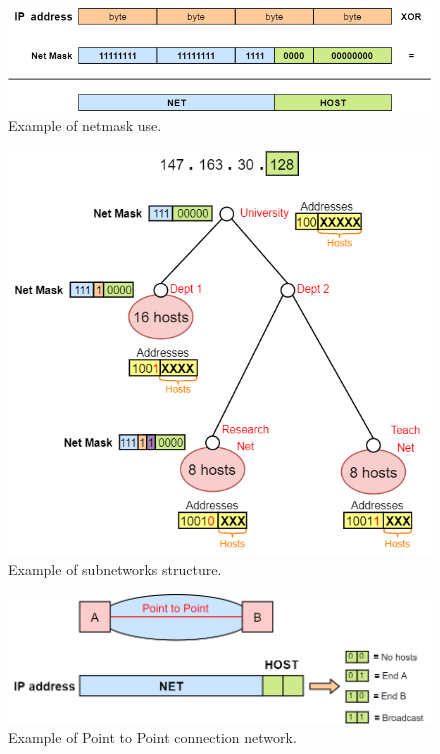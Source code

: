 \begin{figure}[h]
\centering
\includegraphics[scale=0.5]{Images/IP/netmask}
\caption{\footnotesize{Example of netmask use.}}\label{netmask}
\end{figure}
\begin{figure}[h]
\centering
\includegraphics[scale=0.55]{Images/IP/dei_IP}
\caption{\footnotesize{Example of subnetworks structure.}}\label{dei_ip}
\end{figure}
\begin{figure}[h]
\centering
\includegraphics[scale=0.4]{Images/IP/point2point}
\caption{\footnotesize{Example of Point to Point connection network.}}\label{point2point}
\end{figure}
\clearpage
